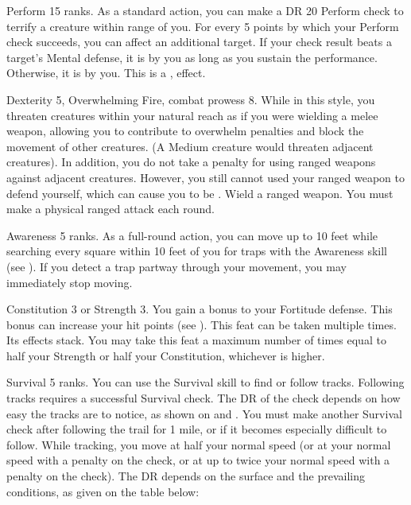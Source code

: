 \featpre Perform 15 ranks.
\featben As a standard action, you can make a DR 20 Perform check to terrify a creature within \rngmed range of you.
For every 5 points by which your Perform check succeeds, you can affect an additional target.
If your check result beats a target's Mental defense, it is \frightened by you as long as you sustain the performance.
Otherwise, it is \shaken by you.
This is a ,  effect.

\featpres Dexterity 5, Overwhelming Fire, combat prowess 8.
\featben While in this style, you threaten creatures within your natural reach as if you were wielding a melee weapon, allowing you to contribute to overwhelm penalties and block the movement of other creatures.
(A Medium creature would threaten adjacent creatures).
In addition, you do not take a  penalty for using ranged weapons against adjacent creatures.
However, you still cannot used your ranged weapon to defend yourself, which can cause you to be .
\stylereq Wield a ranged weapon.
You must make a physical ranged attack each round.

\featpre Awareness 5 ranks.
\featben As a full-round action, you can move up to 10 feet while searching every square within 10 feet of you for traps with the Awareness skill (see ).
If you detect a trap partway through your movement, you may immediately stop moving.

\featpre Constitution 3 or Strength 3.
\featben You gain a  bonus to your Fortitude defense.
This bonus can increase your hit points (see ).
 This feat can be taken multiple times. Its effects stack.
You may take this feat a maximum number of times equal to half your Strength or half your Constitution, whichever is higher.

\featpre Survival 5 ranks.
\featben You can use the Survival skill to find or follow tracks.
Following tracks requires a successful Survival check.
The DR of the check depends on how easy the tracks are to notice, as shown on  and .
You must make another Survival check after following the trail for 1 mile, or if it becomes especially difficult to follow.
While tracking, you move at half your normal speed (or at your normal speed with a  penalty on the check, or at up to twice your normal speed with a  penalty on the check).
The DR depends on the surface and the prevailing conditions, as given on the table below:

